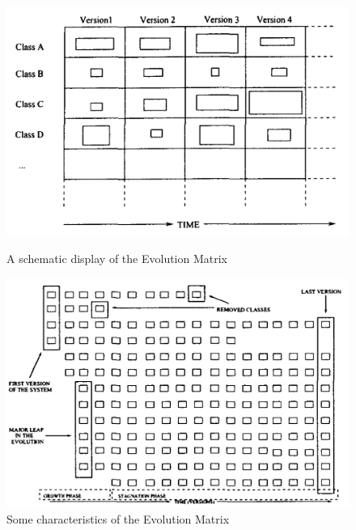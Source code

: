 \begin{figure}[H]
  \includegraphics[width=\linewidth]{EvolutionMatrix1.png}
  \caption{A schematic display of the Evolution Matrix}
\endminipage\hfill
{}
  \includegraphics[width=\linewidth]{EvolutionMatrix2.png}
  \caption{Some characteristics of the Evolution Matrix}
\endminipage\hfill
\end{figure}

\newpage

